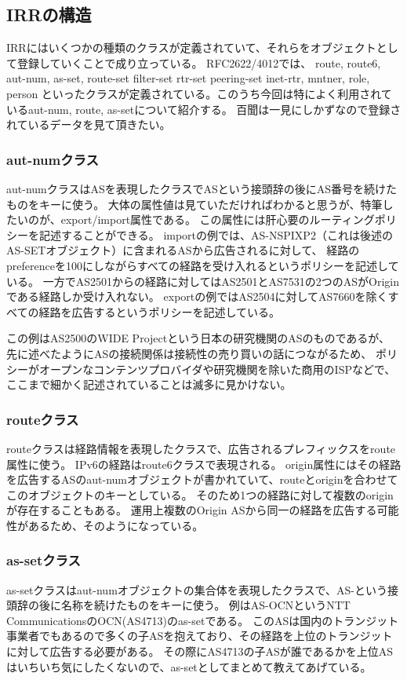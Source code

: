 \subsection{IRRの構造}

IRRにはいくつかの種類のクラスが定義されていて、それらをオブジェクトとして登録していくことで成り立っている。
RFC2622/4012では、
route, route6, aut-num, as-set, route-set filter-set rtr-set peering-set inet-rtr, mntner, role, person
といったクラスが定義されている。このうち今回は特によく利用されているaut-num, route, as-setについて紹介する。
百聞は一見にしかずなので登録されているデータを見て頂きたい。

\subsubsection{aut-numクラス}
aut-numクラスはASを表現したクラスでASという接頭辞の後にAS番号を続けたものをキーに使う。
大体の属性値は見ていただければわかると思うが、特筆したいのが、export/import属性である。
この属性には肝心要のルーティングポリシーを記述することができる。
importの例では、AS-NSPIXP2（これは後述のAS-SETオブジェクト）に含まれるASから広告されるに対して、
経路のpreferenceを100にしながらすべての経路を受け入れるというポリシーを記述している。
一方でAS2501からの経路に対してはAS2501とAS7531の2つのASがOriginである経路しか受け入れない。
exportの例ではAS2504に対してAS7660を除くすべての経路を広告するというポリシーを記述している。

この例はAS2500のWIDE Projectという日本の研究機関のASのものであるが、
先に述べたようにASの接続関係は接続性の売り買いの話につながるため、
ポリシーがオープンなコンテンツプロバイダや研究機関を除いた商用のISPなどで、
ここまで細かく記述されていることは滅多に見かけない。

\subsubsection{routeクラス}
routeクラスは経路情報を表現したクラスで、広告されるプレフィックスをroute属性に使う。
IPv6の経路はroute6クラスで表現される。
origin属性にはその経路を広告するASのaut-numオブジェクトが書かれていて、routeとoriginを合わせてこのオブジェクトのキーとしている。
そのため1つの経路に対して複数のoriginが存在することもある。
運用上複数のOrigin ASから同一の経路を広告する可能性があるため、そのようになっている。

\subsubsection{as-setクラス}
as-setクラスはaut-numオブジェクトの集合体を表現したクラスで、AS-という接頭辞の後に名称を続けたものをキーに使う。
例はAS-OCNというNTT CommunicationsのOCN(AS4713)のas-setである。
このASは国内のトランジット事業者でもあるので多くの子ASを抱えており、その経路を上位のトランジットに対して広告する必要がある。
その際にAS4713の子ASが誰であるかを上位ASはいちいち気にしたくないので、as-setとしてまとめて教えてあげている。

